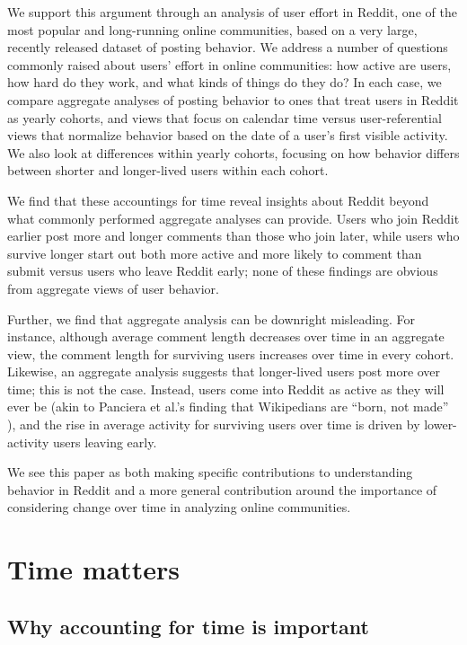 \documentclass[10pt, oneside, onecolumn]{article}
\begin{document}
We support this argument through an analysis of user effort in Reddit, one of the most popular and long-running online communities, based on a very large, recently released dataset of posting behavior.  We address a number of questions commonly raised about users' effort in online communities: how active are users, how hard do they work, and what kinds of things do they do?  In each case, we compare aggregate analyses of posting behavior to ones that treat users in Reddit as yearly cohorts, and views that focus on calendar time versus user-referential views that normalize behavior based on the date of a user's first visible activity.  We also look at differences within yearly cohorts, focusing on how behavior differs between shorter and longer-lived users within each cohort.

We find that these accountings for time reveal insights about Reddit beyond what commonly performed aggregate analyses can provide.  Users who join Reddit earlier post more and longer comments than those who join later, while users who survive longer start out both more active and more likely to comment than submit versus users who leave Reddit early; none of these findings are obvious from aggregate views of user behavior.  

Further, we find that aggregate analysis can be downright misleading.  For instance, although average comment length decreases over time in an aggregate view, the comment length for surviving users increases over time in every cohort.  Likewise, an aggregate analysis suggests that longer-lived users post more over time; this is not the case.  Instead, users come into Reddit as active as they will ever be (akin to Panciera et al.'s finding that Wikipedians are ``born, not made'' \cite{Panciera2009}), and the rise in average activity for surviving users over time is driven by lower-activity users leaving early.

We see this paper as both making specific contributions to understanding behavior in Reddit and a more general contribution around the importance of considering change over time in analyzing online communities. 


\section{Time matters} 

\subsection{Why accounting for time is important}
\end{document}

